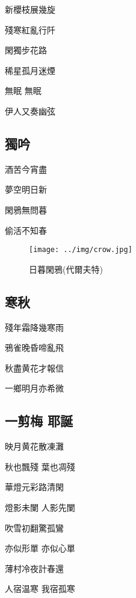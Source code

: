 \documentclass[a4j,12pt]{ltjtarticle}
\begin{document}
\begin{center}
	
	\vfill
		\LARGE 新櫻枝展幾旋 \par
		殘寒紅亂行阡 \par
		閑獨步花路 \par
		稀星孤月迷煙 \par
		無眠  無眠 \par
		伊人又奏幽弦
		\vspace{2cm} %
	\vfill
	
	
	\newpage
	
	\begin{flushleft}
		\section{獨吟} 
	\end{flushleft}	
	
	\vfill
		\LARGE 酒苦今宵盡 \par
		夢空明日新 \par
		閑鴉無問暮 \par
		偷活不知春 
		\vspace{2cm} %
	\vfill
	
	\newpage
	\vfill
	\begin{figure}[h!]
		\centering
		\texttt{[image: ../img/crow.jpg]}
		\caption{日暮閑鴉(代爾夫特)}
		\label{fig:crow}
	\end{figure}
	\vfill
	\newpage
	
	\begin{flushleft}
		\section{寒秋} 
	\end{flushleft}	
	
	\vfill
		\LARGE 殘年霜降幾寒雨 \par
		鴉雀晚昏啼亂飛 \par
		秋盡黄花才報信 \par
		一鄉明月亦希微 
		\vspace{2cm} %
	\vfill
	\newpage
	
	\begin{flushleft}
		\section{一剪梅 耶誕} 
	\end{flushleft}	
	
	
	\vfill
	\LARGE 映月黄花散凍灘 \par
	秋也飄殘  葉也凋殘 \par
	華燈元彩路清閑 \par
	燈影未闌  人影先闌 \par
	吹雪初翻驚孤鸞 \par
	亦似形單 亦似心單 \par
	薄村冷夜計春還 \par
	人宿温寒 我宿孤寒 \par
	

\end{center}
\end{document}
